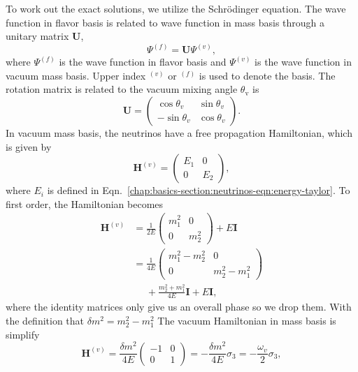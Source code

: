 To work out the exact solutions, we utilize the Schr\"{o}dinger equation. The wave function in flavor basis is related to wave function in mass basis through a unitary matrix $\mathbf U$,
\begin{equation}
\Psi^{(f)} = \mathbf{U}\Psi^{(v)},
\end{equation}
where $\Psi^{(f)}$ is the wave function in flavor basis and $\Psi^{(v)}$ is the wave function in vacuum mass basis. Upper index ${}^{(v)}$ or ${}^{(f)}$ is used to denote the basis. The rotation matrix is related to the vacuum mixing angle $\theta_{\mathrm v}$ is
\begin{equation}
\mathbf{U} = \begin{pmatrix} \cos\theta_v & \sin \theta_v \\ -\sin \theta_v & \cos \theta_v \end{pmatrix}.
\end{equation}
In vacuum mass basis, the neutrinos have a free propagation Hamiltonian, which is given by
\begin{equation}
\mathbf H^{(v)} = \begin{pmatrix} E_1 & 0 \\
0 & E_2
\end{pmatrix},
\end{equation}
where $E_i$ is defined in Eqn.~\ref{chap:basics-section:neutrinos-eqn:energy-taylor}.
To first order, the Hamiltonian becomes
\begin{align*}
\mathbf H^{(v)} &= \frac{1}{2E} \begin{pmatrix}
m_1^2 & 0 \\
0 & m_2^2
\end{pmatrix} + E \mathbf{I}\\
& =  \frac{1}{4E} \begin{pmatrix}
m_1^2 - m_2^2 & 0 \\
0 & m_2^2 - m_1^2
\end{pmatrix} \\
&\phantom{=}+ \frac{m_2^2 + m_1^2}{4E} \mathbf{I} + E \mathbf{I},
\end{align*}
where the identity matrices only give us an overall phase so we drop them. With the definition that $\delta m^2 = m_2^2 - m_1^2$ The vacuum Hamiltonian in mass basis is simplify
\begin{equation}
\mathbf H^{(v)} =  \frac{\delta m^2}{4E} \begin{pmatrix}
-1 & 0 \\
0 & 1
\end{pmatrix} = -\frac{\delta m^2}{4E} \sigma_3 = -\frac{\omega_{v}}{2}\sigma_3 ,
\end{equation}
